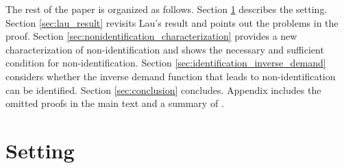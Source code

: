 \documentclass[11pt, a4paper]{article}
\theoremstyle{remark}
\begin{document}
The rest of the paper is organized as follows.
Section \ref{sec:setting} describes the setting.
Section \ref{sec:lau_result} revisits Lau's result and points out the problems in the proof.
Section \ref{sec:nonidentification_characterization} provides a new characterization of non-identification and shows the necessary and sufficient condition for non-identification.
Section \ref{sec:identification_inverse_demand} considers whether the inverse demand function that leads to non-identification can be identified.
Section \ref{sec:conclusion} concludes.
Appendix includes the omitted proofs in the main text and a summary of \citet{goldmanNote1964}.


















\section{Setting}\label{sec:setting}
\end{document}
